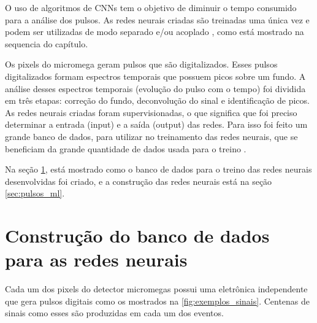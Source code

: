 \documentclass[a4paper,12pt,oneside]{book}
\begin{document}
\par O uso de algoritmos de CNNs tem o objetivo de diminuir o tempo consumido para a análise dos pulsos. As redes neurais criadas são treinadas uma única vez e podem ser utilizadas de modo separado e/ou acoplado \cite{FORTINO2022166497}, como está mostrado na sequencia do capítulo.

\par Os pixels do micromega geram pulsos que são digitalizados. Esses pulsos digitalizados formam espectros temporais que possuem picos sobre um fundo. A análise desses espectros temporais (evolução do pulso com o tempo) foi dividida em três etapas: correção do fundo, deconvolução do sinal e identificação de picos. As redes neurais criadas foram supervisionadas, o que significa que foi preciso determinar a entrada (input) e a saída (output) das redes. Para isso foi feito um grande banco de dados, para utilizar no treinamento das redes neurais, que se beneficiam da grande quantidade de dados usada para o treino \cite{mlbook}.

\par Na seção \ref{sec:pulses_trad}, está mostrado como o banco de dados para o treino das redes neurais desenvolvidas foi criado, e a construção das redes neurais está na seção \ref{sec:pulsos_ml}.






\section{Construção do banco de dados para as redes neurais}\label{sec:pulses_trad}

\par Cada um dos pixels do detector micromegas possui uma eletrônica independente que gera pulsos digitais como os mostrados na \ref{fig:exemplos_sinais}. Centenas de sinais como esses são produzidas em cada um dos eventos.
\end{document}
